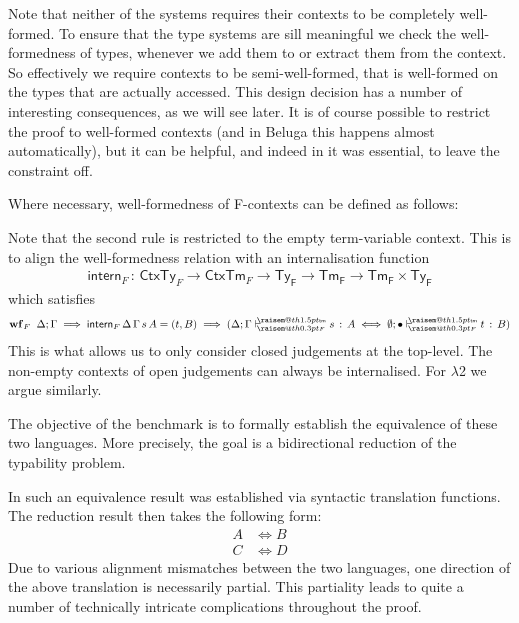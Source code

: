 \documentclass[a4paper,UKenglish]{lipics-v2016}
\makeatletter
\newcommand{\ms}{\,}
\newcommand{\mrel}[1]{\mathrel{\ms #1 \ms}}
\newcommand{\dom}[1]{\ensuremath{\textrm{dom($#1$)}}}
\newcommand{\OF}{\mrel{:}}
\newcommand{\SysL}{$\lambda$2\xspace}
\newcommand{\TyF}{\ensuremath{\mathsf{Ty_{F}}}}
\newcommand{\TmF}{\ensuremath{\mathsf{Tm_{F}}}}
\newcommand{\ty}{\mathsf{ty}}
\newcommand{\tm}{\mathsf{tm}}
\newcommand{\of}{\ensuremath{\!:\!}}
\newcommand{\cc}[2]{#1;#2} %
\newcommand{\raisemath}[1]{\mathpalette{\raisem@th{#1}}}
\newcommand{\raisem@th}[3]{\raisebox{#1}{\ensuremath{#2#3}}}
\newcommand{\tsAnnot}[2]{\vdash\hspace{-.7em}^{\raisemath{1.5pt}{\scriptscriptstyle{#2}}}_{\raisemath{0.3pt}{\scriptscriptstyle{#1}}}} %
\newcommand{\tfF}{\tsAnnot{F}{\ty}}  %
\newcommand{\tyF}{\tsAnnot{F}{\tm}}  %
\newcommand{\istyF}[2]{\ensuremath{{#1} \mathrel{\tfF} #2}}
\newcommand{\typingF}[3]{\ensuremath{{#1} \mathrel{\tyF} #2 \OF #3}}
\newcommand{\emptyctx}{\ensuremath{\bullet}}
\makeatother
\begin{document}
Note that neither of the systems requires their contexts to be completely well-formed.
To ensure that the type systems are sill meaningful we check the well-formedness of types, whenever we add them to or extract them from the context.
So effectively we require contexts to be semi-well-formed, that is well-formed on the types that are actually accessed.
This design decision has a number of interesting consequences, as we will see later.
It is of course possible to restrict the proof to well-formed contexts (and in Beluga this happens almost automatically), but it can be helpful, and indeed in \cite{KaiserEtAl:2017:sysf_pts_equiv_coq} it was essential, to leave the constraint off.

Where necessary, well-formedness of F-contexts can be defined as follows:

Note that the second rule is restricted to the empty term-variable context.
This is to align the well-formedness relation with an internalisation function
\begin{align*}
  \mathsf{intern}_{F} \OF \mathsf{CtxTy}_{F} \to \mathsf{CtxTm}_{F} \to \TyF \to \TmF \to \TmF \times \TyF
\end{align*}
which satisfies
\begin{align*}
  \mathbf{wf}_{F}\;\;\cc{\Delta}{\Gamma} \implies \mathsf{intern}_{F}\,\Delta\,\Gamma\,s\,A = (t,B) \implies (\typingF{\cc{\Delta}{\Gamma}}{s}{A} \iff \typingF{\cc{\emptyset}{\emptyctx}}{t}{B})
\end{align*}
This is what allows us to only consider closed judgements at the top-level.
The non-empty contexts of open judgements can always be internalised.
For \SysL we argue similarly.

The objective of the benchmark is to formally establish the equivalence of these two languages.
More precisely, the goal is a bidirectional reduction of the typability problem.

In \cite{KaiserEtAl:2017:sysf_pts_equiv_coq} such an equivalence result was established via syntactic translation functions.
The reduction result then takes the following form:
\begin{align*}
  A &\iff B\\
  C &\iff D
\end{align*}
Due to various alignment mismatches between the two languages, one direction of the above translation is necessarily partial.
This partiality leads to quite a number of technically intricate complications throughout the proof.
\end{document}
